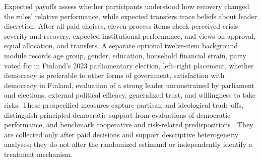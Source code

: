 \documentclass[11pt,a4paper]{article}
\begin{document}
Expected payoffs assess whether participants understood how recovery changed the rules' relative performance, while expected transfers trace beliefs about leader discretion. After all paid choices, eleven process items check perceived crisis severity and recovery, expected institutional performance, and views on approval, equal allocation, and transfers. A separate optional twelve-item background module records age group, gender, education, household financial strain, party voted for in Finland's 2023 parliamentary election, left--right placement, whether democracy is preferable to other forms of government, satisfaction with democracy in Finland, evaluation of a strong leader unconstrained by parliament and elections, external political efficacy, generalized trust, and willingness to take risks. These prespecified measures capture partisan and ideological trade-offs, distinguish principled democratic support from evaluations of democratic performance, and benchmark cooperative and risk-related predispositions \parencites{GRAHAM2020,0b3bf,Claassen2020,Dohmen2011,Glaeser2000}. They are collected only after paid decisions and support descriptive heterogeneity analyses; they do not alter the randomized estimand or independently identify a treatment mechanism. 
\end{document}
